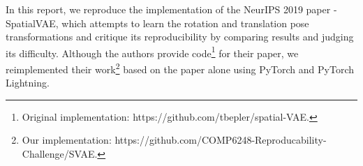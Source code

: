 In this report, we reproduce the implementation of the NeurIPS 2019 paper - SpatialVAE, which attempts to learn the rotation and translation pose transformations and critique its reproducibility by comparing results and judging its difficulty. Although the authors provide code\footnote{Original implementation: https://github.com/tbepler/spatial-VAE.} for their paper, we reimplemented their work\footnote{Our implementation: https://github.com/COMP6248-Reproducability-Challenge/SVAE.} based on the paper alone using PyTorch and PyTorch Lightning.

